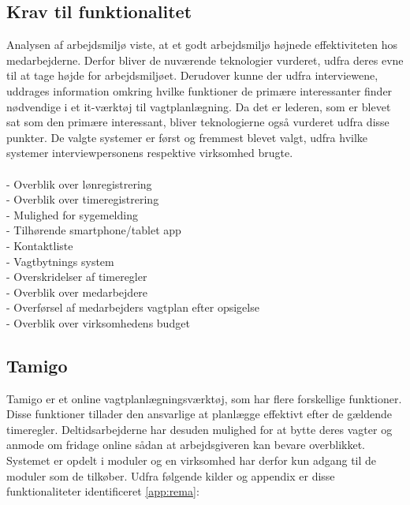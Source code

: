 \subsection{Krav til funktionalitet}
Analysen af arbejdsmiljø viste, at et godt arbejdsmiljø højnede effektiviteten hos medarbejderne. Derfor bliver de nuværende teknologier vurderet, udfra deres evne til at tage højde for arbejdsmiljøet. Derudover kunne der udfra interviewene, uddrages information omkring hvilke funktioner de primære interessanter finder nødvendige i et it-værktøj til vagtplanlægning. Da det er lederen, som er blevet sat som den primære interessant, bliver teknologierne også vurderet udfra disse punkter. De valgte systemer er først og fremmest blevet valgt, udfra hvilke systemer interviewpersonens respektive virksomhed brugte. 
\\\\
- Overblik over lønregistrering\\
- Overblik over timeregistrering\\
- Mulighed for sygemelding\\
- Tilhørende smartphone/tablet app\\
- Kontaktliste\\
- Vagtbytnings system\\
- Overskridelser af timeregler\\
- Overblik over medarbejdere\\
- Overførsel af medarbejders vagtplan efter opsigelse\\
- Overblik over virksomhedens budget\\

\subsection{Tamigo}
Tamigo er et online vagtplanlægningsværktøj, som har flere forskellige funktioner. Disse funktioner tillader den ansvarlige at planlægge effektivt efter de gældende timeregler. Deltidsarbejderne har desuden mulighed for at bytte deres vagter og anmode om fridage online sådan at arbejdsgiveren kan bevare overblikket. Systemet er opdelt i moduler og en virksomhed har derfor kun adgang til de moduler som de tilkøber. Udfra følgende kilder og appendix er disse funktionaliteter identificeret \citep{Tamigo, Trustpilot} \ref{app:rema}:

